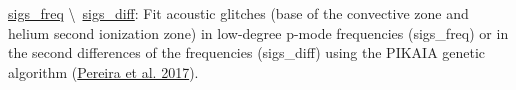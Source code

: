 \documentclass[letterpaper,10pt,oneside]{article}
\begin{document}
\begin{body}
\GapNoBreak
\BulletItem
\href{https://github.com/Fill4/sigs_freq}{sigs\_freq} \textbackslash \ \href{https://github.com/Fill4/sigs_diff}{sigs\_diff}: 
Fit acoustic glitches (base of the convective zone and helium second ionization zone) in low-degree p-mode frequencies (sigs\_freq) or in the second differences of the frequencies (sigs\_diff) using the PIKAIA genetic algorithm 
(\href{https://doi.org/10.1051/epjconf/201716001015}{Pereira et al. 2017}).





\end{body}
\label{LastPage}
\end{document}
